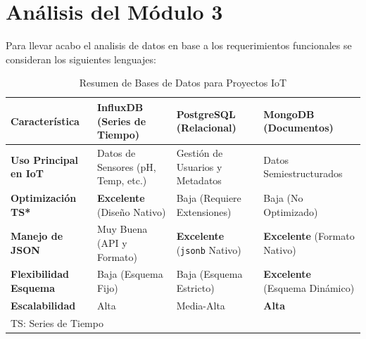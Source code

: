 \section{Análisis del Módulo 3}
Para llevar acabo el analisis de datos en base a los requerimientos funcionales se 
consideran los siguientes lenguajes:
\begin{table}[h]
    \centering
    \caption{Resumen de Bases de Datos para Proyectos IoT}
    \label{tab:bd_resumen}
    \begin{tabular}{|l|l|l|l|}
        \hline
        \textbf{Característica} & \textbf{InfluxDB (Series de Tiempo)} & \textbf{PostgreSQL (Relacional)} & \textbf{MongoDB (Documentos)} \\
        \hline
        \textbf{Uso Principal en IoT} & Datos de Sensores (pH, Temp, etc.) & Gestión de Usuarios y Metadatos & Datos Semiestructurados \\
        \hline
        \textbf{Optimización TS*} & \textbf{Excelente} (Diseño Nativo) & Baja (Requiere Extensiones) & Baja (No Optimizado) \\
        \hline
        \textbf{Manejo de JSON} & Muy Buena (API y Formato) & \textbf{Excelente} (\texttt{jsonb} Nativo) & \textbf{Excelente} (Formato Nativo) \\
        \hline
        \textbf{Flexibilidad Esquema} & Baja (Esquema Fijo) & Baja (Esquema Estricto) & \textbf{Excelente} (Esquema Dinámico) \\
        \hline
        \textbf{Escalabilidad} & Alta & Media-Alta & \textbf{Alta} \\
        \hline
        \multicolumn{4}{l}{\small *TS: Series de Tiempo} \\
    \end{tabular}
\end{table}
